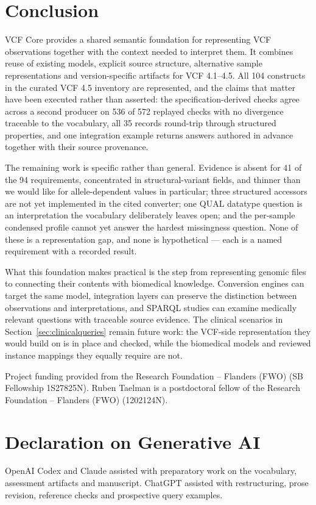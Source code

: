 \documentclass{ceurart}
\begin{document}
\section{Conclusion}

VCF Core provides a shared semantic foundation for representing VCF observations together with the context needed to interpret them. 
It combines reuse of existing models, explicit source structure, alternative sample representations and version-specific artifacts for VCF 4.1--4.5. 
All 104 constructs in the curated VCF 4.5 inventory are represented, and the claims that matter have been executed rather than asserted: the specification-derived checks agree across a second producer on 536 of 572 replayed checks with no divergence traceable to the vocabulary, all 35 records round-trip through structured properties, and one integration example returns answers authored in advance together with their source provenance.

The remaining work is specific rather than general. 
Evidence is absent for 41 of the 94 requirements, concentrated in structural-variant fields, and thinner than we would like for allele-dependent values in particular; three structured accessors are not yet implemented in the cited converter; one QUAL datatype question is an interpretation the vocabulary deliberately leaves open; and the per-sample condensed profile cannot yet answer the hardest missingness question. 
None of these is a representation gap, and none is hypothetical --- each is a named requirement with a recorded result.

What this foundation makes practical is the step from representing genomic files to connecting their contents with biomedical knowledge. 
Conversion engines can target the same model, integration layers can preserve the distinction between observations and interpretations, and SPARQL studies can examine medically relevant questions with traceable source evidence. 
The clinical scenarios in Section~\ref{sec:clinicalqueries} remain future work: the VCF-side representation they would build on is in place and checked, while the biomedical models and reviewed instance mappings they equally require are not.

\begin{acknowledgments}
Project funding provided from the Research Foundation -- Flanders (FWO) (SB Fellowship 1S27825N).
Ruben Taelman is a postdoctoral fellow of the Research Foundation -- Flanders (FWO) (1202124N).
\end{acknowledgments}

\section*{Declaration on Generative AI}
OpenAI Codex and Claude assisted with preparatory work on the vocabulary, assessment artifacts and manuscript. ChatGPT assisted with restructuring, prose revision, reference checks and prospective query examples. 

\label{endofmain}

{
}
\end{document}

